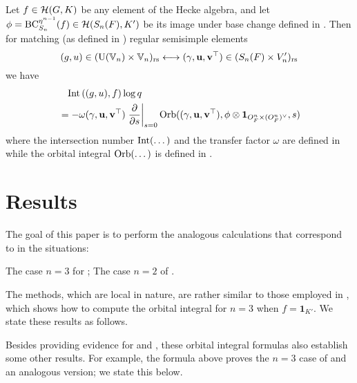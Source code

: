 \begin{conjecture}
  Let $f \in \mathcal H(G, K)$ be any element of the Hecke algebra,
  and let $\phi = \operatorname{BC}_{S_n}^{\eta^{n-1}}(f) \in \mathcal H(S_n(F), K')$ be its image
  under base change defined in .
  Then for matching (as defined in ) regular semisimple elements
  \[ (g, u) \in (\operatorname{U}(\mathbb V_n) \times \mathbb V_n)_{\mathrm{rs}} \longleftrightarrow
    (\gamma, \mathbf u, \mathbf v^\top) \in (S_n(F) \times V_n')_{\mathrm{rs}} \]
  we have
  \begin{equation}
    \begin{aligned}
      &\phantom= \Int\left( (g,u), f \right) \log q \\
      &= -\omega(\gamma, \uu, \vv^\top) \left. \pdv{}{s} \right\rvert_{s=0}
      \Orb( (\gamma, \uu, \vv^\top), \phi \otimes \oneV, s)
    \end{aligned}
  \end{equation}
  where the intersection number $\operatorname{Int}(\dots)$ and the transfer factor $\omega$
  are defined in 
  while the orbital integral $\operatorname{Orb}(\dots)$ is defined in .
  \label{conj:semi_lie_spherical}
\end{conjecture}

\section{Results}
The goal of this paper is to perform the analogous calculations
that correspond to \cite[Lemma 7.1.1 and Proposition 7.3.2]{ref:AFLspherical} in the situations:
\begin{itemize}
  \ii The case $n = 3$ for ;
  \ii The case $n = 2$ of .
\end{itemize}
The methods, which are local in nature,
are rather similar to those employed in \cite{ref:AFL},
which shows how to compute the orbital integral for $n = 3$ when $f = \mathbf{1}_{K'}$.
We state these results as follows.

\begin{theorem}
\end{theorem}

Besides providing evidence for  and ,
these orbital integral formulas also establish some other results.
For example, the formula above
proves the $n = 3$ case of \cite[Conjecture 8.2.1]{ref:AFLspherical}
and an analogous version; we state this below.

